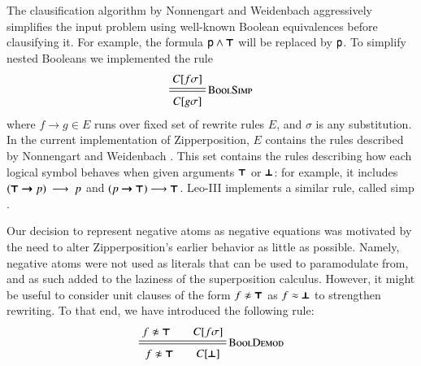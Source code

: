 The clausification algorithm by Nonnengart and Weidenbach \cite{nw-01-small-cnf}
aggressively simplifies the input problem using well-known Boolean equivalences before clausifying it. For example,
the formula $\mathsf{p}\land\pmb\top$ will be replaced by $\mathsf{p}$. To simplify nested Booleans we implemented the rule
\pagebreak[2]
\[
\namedsimp{BoolSimp}{C[f\sigma]}{C[g\sigma]}
\]
where $f \longrightarrow g \in E$ runs over fixed set of rewrite rules $E$,
and $\sigma$ is any substitution. In the current implementation of Zipperposition, $E$ contains the rules
described by Nonnengart and Weidenbach \cite[Section~3]{nw-01-small-cnf}. This set contains
the rules describing how each logical symbol behaves when given arguments $\pmb\top$ or $\pmb\bot$: for example, 
it includes $(\pmb\top \pmb\rightarrow p)~\longrightarrow~p $ and $(p \pmb\rightarrow \pmb\top) \longrightarrow \pmb\top$. %
Leo-III implements a similar rule, called \textsf{simp} \cite[Section 4.2.1.]{as-18-phd}.


Our decision to represent negative atoms as negative equations was motivated by
the need to alter Zipperposition's earlier behavior as little as possible. 
Namely, negative atoms were not used as literals that can be used
to paramodulate from, and as such added to the laziness of the superposition calculus.
However, it might be useful to consider unit clauses of the form $f \noteq \itrue$
as $f \approx \pmb\bot$ to strengthen rewriting. To that end, we have introduced the following
rule:
%
$$ \namedsimp{BoolDemod}{f \noteq \itrue \qquad C[f\sigma]}{f \noteq \itrue \qquad C[\ifalse]} $$
